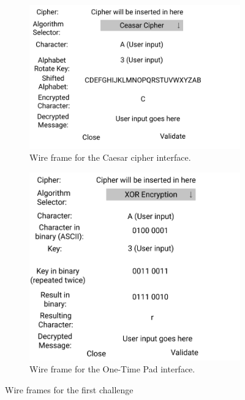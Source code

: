\documentclass{l4proj}
\begin{document}
\begin{figure}
    \centering
    \begin{subfigure}[b]{0.5\textwidth}
        \includegraphics[width=\textwidth, frame]{images/CaesarCipher.png}
        \caption{Wire frame for the Caesar cipher interface.}
        \label{fig:Caesar}
    \end{subfigure}

    \begin{subfigure}[b]{0.5\textwidth}
        \includegraphics[width=\textwidth, frame]{images/xOR.png}
        \caption{Wire frame for the One-Time Pad interface.}
        \label{fig:xOR}
    \end{subfigure}
    
    \caption{Wire frames for the first challenge}
    \label{fig:Challenge1}

\end{figure}
\end{document}
